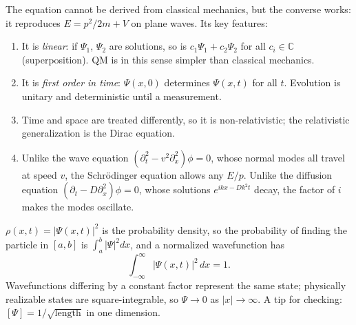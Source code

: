 The equation cannot be derived from classical mechanics, but the converse works: it reproduces $E = p^2/2m + V$ on plane waves. Its key features:
\begin{enumerate}
    \item It is \emph{linear}: if $\Psi_1$, $\Psi_2$ are solutions, so is $c_1\Psi_1+c_2\Psi_2$ for all $c_i\in\mathbb{C}$ (superposition). QM is in this sense simpler than classical mechanics.
    \item It is \emph{first order in time}: $\Psi(x,0)$ determines $\Psi(x,t)$ for all $t$. Evolution is unitary and deterministic until a measurement.
    \item Time and space are treated differently, so it is non-relativistic; the relativistic generalization is the Dirac equation.
    \item Unlike the wave equation $(\partial_t^2 - v^2\partial_x^2)\phi = 0$, whose normal modes all travel at speed $v$, the Schr\"odinger equation allows any $E/p$. Unlike the diffusion equation $(\partial_t - D\partial_x^2)\phi = 0$, whose solutions $e^{ikx-Dk^2t}$ decay, the factor of $i$ makes the modes oscillate.
\end{enumerate}

\begin{definition}
$\rho(x,t) = |\Psi(x,t)|^2$ is the probability density, so the probability of finding the particle in $[a,b]$ is $\int_a^b|\Psi|^2dx$, and a normalized wavefunction has
\[
    \int_{-\infty}^\infty|\Psi(x,t)|^2\,dx = 1 .
\]
Wavefunctions differing by a constant factor represent the same state; physically realizable states are square-integrable, so $\Psi\to0$ as $|x|\to\infty$. A tip for checking: $[\Psi] = 1/\sqrt{\text{length}}$ in one dimension.
\end{definition}


